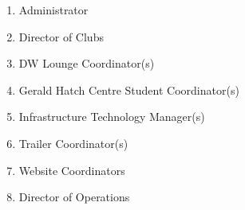 \begin{enumerate}
  \begin{enumerate}
   \item
    Administrator
   \item
    Director of Clubs
   \item
    DW Lounge Coordinator(s)
   \item
    Gerald Hatch Centre Student Coordinator(s)
   \item
    Infrastructure Technology Manager(s)
   \item
    Trailer Coordinator(s)
   \item    
    Website Coordinators 
   \item    
    Director of Operations 

  \end{enumerate}
\end{enumerate}